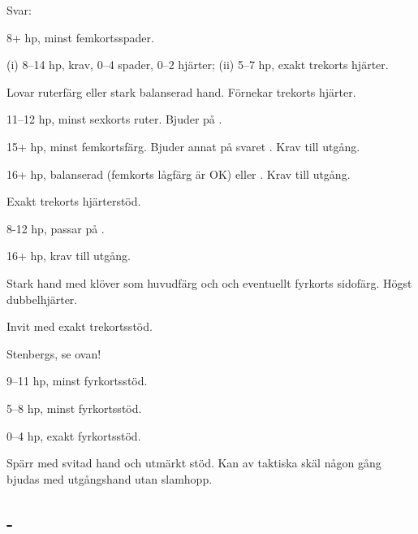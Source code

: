 Svar:
\begin{beskriv}
   \item[\NT{1}] 8+ hp, minst femkortsspader.
   \item[\spa{1}] (i) 8--14 hp, krav, 0--4 spader, 0--2 hjärter; (ii) 5--7
     hp, exakt trekorts hjärter. 
   \item[\kl{2}] Lovar ruterf\"arg eller stark balanserad hand. Förnekar
                 trekorts hjärter.
         \begin{nummer}
           \item 11--12 hp, minst sexkorts ruter. Bjuder  på .
           \item 15+ hp, minst femkortsf{\"a}rg. Bjuder annat p{\aa} svaret
                      . Krav till utgång.
	   \item 16+ hp, balanserad (femkorts lågfärg är OK) eller
                        . Krav till utgång.
          \end{nummer}
   \item[\ru{2}] Exakt trekorts hj\"arterst\"od.
          \begin{nummer}
            \item 8-12 hp, passar på .
            \item 16+ hp, krav till utgång.
           \end{nummer}
   \item[\hj{2}] Stark hand med kl\"over som
                 huvudf\"arg och och eventuellt fyrkorts sidofärg. Högst
                 dubbelhjärter.
   \item[\spa{2}] Invit med exakt trekortsstöd.
   \item[\NT{2}] Stenbergs, se ovan!
   \item[\kl{3}] 9--11 hp, minst fyrkortsstöd.
   \item[\ru{3}] 5--8 hp, minst fyrkortsstöd.
   \item[\hj{3}] 0--4 hp, exakt fyrkortsstöd.
   \item[\hj{4}] Spärr med svitad hand och utmärkt stöd. Kan av taktiska
     skäl någon gång bjudas med utgångshand utan slamhopp.
\end{beskriv}

\subsection{ - }

